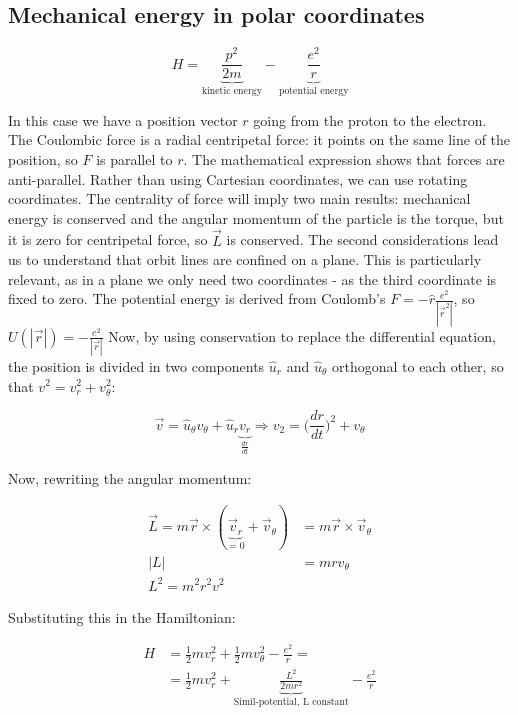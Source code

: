   \subsection{Mechanical energy in polar coordinates}

  $$H = \underbrace{\frac{p^2}{2m}}_{\text{kinetic energy}}-\underbrace{\frac{e^2}{r}}_{\text{potential energy}}$$

  In this case we have a position vector $r$ going from the proton to the electron.
  The Coulombic force is a radial centripetal force: it points on the same line of the position, so $F$ is parallel to $r$.
  The mathematical expression shows that forces are anti-parallel.
  Rather than using Cartesian coordinates, we can use rotating coordinates.
  The centrality of force will imply two main results: mechanical energy is conserved and the angular momentum  of the particle is the torque, but it is zero for centripetal force, so $\vec{L}$ is conserved.
  The second considerations lead us to understand that orbit lines are confined on a plane. This is particularly relevant, as in a plane we only need two coordinates - as the third coordinate is fixed to zero.
  The potential energy is derived from Coulomb's $F=-\hat{r}\frac{e^2}{|\vec{r}^2|}$, so $U(|\vec{r}|) = -\frac{e^2}{|\vec{r}|}$
  Now, by using conservation to replace the differential equation, the position is divided in two components $\hat{u}_r$ and $\hat{u}_\theta$ orthogonal to each other, so that $v^2 = v_r^2+v_\theta^2$:

  $$\vec{v} = \hat{u}_\theta v_\theta +\hat{u}_r\underbrace{v_r}_{\frac{d{r}}{d{t}}}\Rightarrow v_2 = \biggl(\frac{d{r}}{d{t}}\biggr)^2+v_\theta$$

  Now, rewriting the angular momentum:

  \begin{align*}
    \vec{L} = m \vec{r}\times(\underbrace{\vec{v}_r}_{=0}+\vec{v}_\theta) &= m \vec{r}\times\vec{v}_\theta\\
    |L| &= mrv_\theta\\
    L^2 = m^2r^2v^2
  \end{align*}

  Substituting this in the Hamiltonian:

  \begin{align*}
    H &= \frac{1}{2}mv_r^2 + \frac{1}{2}mv_\theta^2 - \frac{e^2}{r}=\\
      &=\frac{1}{2}mv_r^2 + \underbrace{\frac{L^2}{2mr^2}}_{\text{Simil-potential, L constant}} - \frac{e^2}{r}
  \end{align*}

